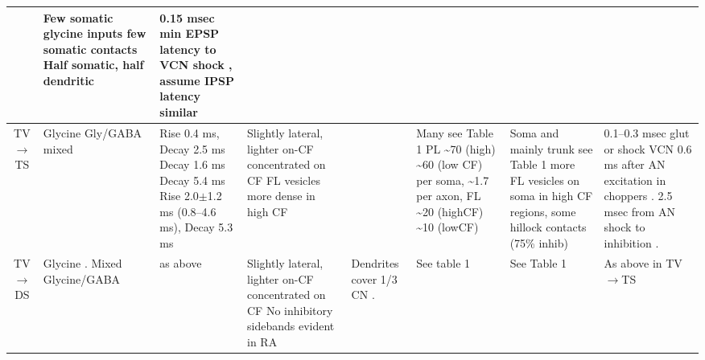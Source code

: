 \begin{longtable}{cYYYYYYY}
& 
Few somatic glycine inputs \citep{OsenOttersenEtAl:1990,OstapoffMorestEtAl:1999,ZhangOertel:1993} 
few  somatic contacts \citep{Alibardi:1999}                   
Half somatic, half dendritic \citep[rat][]{RubioJuiz:2004}
& 
0.15 msec min EPSP latency to VCN shock , assume IPSP latency similar
\citep{ZhangOertel:1993}\\ \midrule
TV\ensuremath{\rightarrow}TS                        
& %
Glycine \citep{OertelWickesberg:1993,OstapoffMorestEtAl:1999,SaintBensonEtAl:1991,WickesbergOertel:1993}
Gly\slash GABA mixed \citep[Cat,][]{OsenOttersenEtAl:1990}                  
& %
Rise 0.4 ms, Decay 2.5 ms \citep[spontaneous IPSCs in rat MNTB neurons,][]{AwatramaniTurecekEtAl:2005}
Decay 1.6 ms \citep[mouse VCN,]{Oertel:1983}
Decay 5.4 ms \citep{OertelWickesberg:1993,WickesbergOertel:1993}    
Rise 2.0$\pm$1.2 ms (0.8--4.6 ms), Decay 5.3 ms \citep[Gly puffs at 22$^\circ$C (Q$_{10}$ 2.1) in  guinea pig VCN,][]{HartyManis:1998}
& %
Slightly lateral, lighter on-CF \citep{OstapoffMorestEtAl:1999} 
concentrated on CF \citep{ZhangOertel:1993} 
FL vesicles more dense in high CF \citep{JosephsonMorest:1998}                        
& %
& %
Many \citep{OstapoffMorestEtAl:1999} see
Table 1 \citep{SmithRhode:1989} 
PL \~{}70 (high) \~{}60 (low CF) per soma,
\~{}1.7 per axon, 
FL \~{}20 (highCF) \~{}10 (lowCF)  \citep{JosephsonMorest:1998}                        
& %
Soma and mainly trunk \citep{AltschulerJuizEtAl:1993} 
see Table 1 \citep{SmithRhode:1989} 
more FL vesicles on soma in high CF regions, some hillock contacts (75\% inhib) \citep{JosephsonMorest:1998}
& %
0.1--0.3 msec glut or shock VCN \citep{ZhangOertel:1993}
0.6 ms after AN excitation in choppers \citep{Wickesberg:1996}. 
2.5 msec from AN shock to inhibition \citep{WickesbergOertel:1993}. 
\\ \midrule
TV\ensuremath{\rightarrow}DS                        
&  %
Glycine \citep{OstapoffMorestEtAl:1999,SaintBensonEtAl:1991}. 
Mixed  Glycine/GABA \citep{OsenOttersenEtAl:1990}                 
& %
\citep{OstapoffMorestEtAl:1999}  as above                                  
& %
Slightly lateral, lighter on-CF \citep{OstapoffMorestEtAl:1999}
concentrated on CF \citep{ZhangOertel:1993} 
No inhibitory sidebands evident in RA                                   
& %
Dendrites cover 1/3 CN \citep[guinea pig][]{PalmerJiangEtAl:1996}.
& See table 1 \citep{SmithRhode:1989}     
& See Table 1 \citep{SmithRhode:1989}                          
& 
As above in TV\ensuremath{\rightarrow}TS

\end{longtable}
